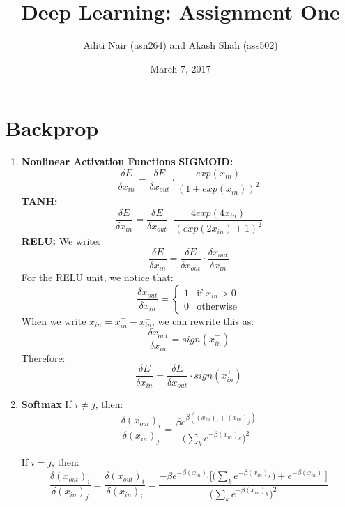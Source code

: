 \documentclass[a4paper]{article}
\title{Deep Learning: Assignment One}
\author{Aditi Nair (asn264) and Akash Shah (ass502)}
\date{March 7, 2017}
\begin{document}
\maketitle

\section{Backprop}
\begin{enumerate}
\item{ \textbf{Nonlinear Activation Functions}
\newline
\newline
\textbf{SIGMOID:}\newline
$$\frac{\delta E} {\delta x_{in}} = \frac{\delta E}{\delta x_{out}} \cdot \frac{exp(x_{in})}{(1+exp(x_{in}))^2}$$
\newline
\textbf{TANH:}\newline
$$\frac{\delta E}{\delta x_{in}} =  \frac{\delta E}{\delta x_{out}} \cdot \frac{4 exp(4 x_{in})}{(exp(2 x_{in})+1)^2} $$
\newline
\textbf{RELU:}\newline
\newline
We write:
$$\frac{\delta E}{\delta x_{in}} =  \frac{\delta E}{\delta x_{out}} \cdot \frac{\delta x_{out}}{\delta x_{in}}$$
For the RELU unit, we notice that:
\begin{equation}\frac{\delta x_{out}}{\delta x_{in}} = 
\left\{
	\begin{array}{ll}
		1 & \mbox{if } x_{in}  > 0\\
		0 & \mbox{otherwise}
	\end{array}
\right.\end{equation}
When we write $x_{in} = x_{in}^+ - x_{in}^-$, we can rewrite this as:
$$\frac{\delta x_{out}}{\delta x_{in}} = sign(x_{in}^+) $$ 
Therefore:
$$\frac{\delta E}{\delta x_{in}} =  \frac{\delta E}{\delta x_{out}} \cdot sign(x_{in}^+) $$

}

\item{ \textbf{Softmax} 
\newline
\newline
If $i \neq j$, then:
$$\frac{\delta (x_{out})_i}{ \delta (x_{in})_j } = 
\frac{\beta e^{\beta ( (x_{in})_i + (x_{in})_j )}}{ \Big( \sum_k e^{- \beta (x_{in})_k} \Big)^2} 
$$

If $i = j$, then:
$$\frac{\delta (x_{out})_i}{ \delta (x_{in})_j } = \frac{\delta (x_{out})_i}{ \delta (x_{in})_i } = \frac{ - \beta e^{- \beta (x_{in})_i }  \Bigg[ \Big( \sum_k e^{- \beta (x_{in})_k} \Big) + e^{-\beta (x_{in})_i}  \Bigg] } {\Big( \sum_k e^{- \beta (x_{in})_k} \Big)^2 } $$

}
\end{enumerate}
\end{document}
